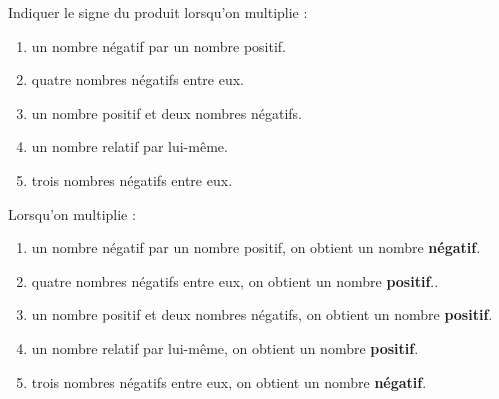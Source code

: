 \begin{exercice*}
    Indiquer le signe du produit lorsqu'on multiplie :
        \begin{enumerate}
            \item un nombre négatif par un nombre positif.
            \item quatre nombres négatifs entre eux.
            \item un nombre positif et deux nombres négatifs.
            \item un nombre relatif par lui-même.
            \item trois nombres négatifs entre eux.
        \end{enumerate}
\end{exercice*}
\begin{corrige}
    \phantom{rrr}    
    Lorsqu'on multiplie : 
    
        \begin{enumerate}
            \item un nombre négatif par un nombre positif, on obtient un nombre {\bfseries \color[HTML]{f15929}négatif}.
            \item quatre nombres négatifs entre eux, on obtient un nombre {\bfseries \color[HTML]{f15929}positif}..
            \item un nombre positif et deux nombres négatifs, on obtient un nombre {\bfseries \color[HTML]{f15929}positif}.
            \item un nombre relatif par lui-même, on obtient un nombre {\bfseries \color[HTML]{f15929}positif}.
            \item trois nombres négatifs entre eux, on obtient un nombre {\bfseries \color[HTML]{f15929}négatif}.
        \end{enumerate}
\end{corrige}

